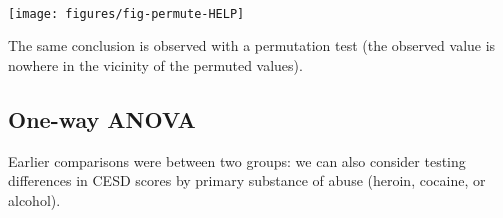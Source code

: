 \begin{knitrout}
{\begin{kframe}
\begin{flushleft}
\hlstd{}{\ }{\ }{\ }{\ }\hlkeyword{,}{\ }\hlargument{=}{\ }\hlkeyword{,}{\ }\hlargument{=}{\ }\hlkeyword{)}{\ }{\ }\hspace*{\fill}\\
\hlstd{}\hlkeyword{(}\hlkeyword{(}\hlargument{=}{\ }\hlkeyword{)}\hlkeyword{)}\mbox{}
\normalfont
\end{flushleft}


\centering{}\texttt{[image: figures/fig-permute-HELP]} 

\end{kframe}}
\end{knitrout}




The same conclusion is observed with a permutation test (the
observed value is nowhere in the vicinity of the permuted values).

\subsection{One-way ANOVA}

Earlier comparisons were between two groups: we can also consider testing differences 
in CESD scores by primary substance of abuse (heroin, cocaine, or alcohol).

\begin{center}
\begin{knitrout}
\end{knitrout}

\end{center}


